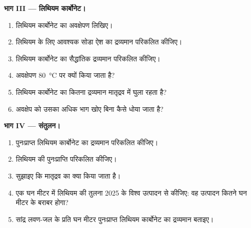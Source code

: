 \begin{problem}
\medskip
\noindent\textbf{भाग III --- लिथियम कार्बोनेट।}
\begin{enumerate}[resume]
  \item लिथियम कार्बोनेट का अवक्षेपण लिखिए।
  \item लिथियम के लिए आवश्यक सोडा ऐश का द्रव्यमान परिकलित कीजिए।
  \item लिथियम कार्बोनेट का सैद्धांतिक द्रव्यमान परिकलित कीजिए।
  \item अवक्षेपण \qty{80}{\celsius} पर क्यों किया जाता है?
  \item लिथियम कार्बोनेट का कितना द्रव्यमान मातृद्रव में घुला रहता है?
  \item अवक्षेप को उसका अधिक भाग खोए बिना कैसे धोया जाता है?
\end{enumerate}

\medskip
\noindent\textbf{भाग IV --- संतुलन।}
\begin{enumerate}[resume]
  \item पुनःप्राप्त लिथियम कार्बोनेट का द्रव्यमान परिकलित कीजिए।
  \item लिथियम की पुनःप्राप्ति परिकलित कीजिए।
  \item सुझाइए कि मातृद्रव का क्या किया जाता है।
  \item एक घन मीटर में लिथियम की तुलना 2025 के विश्व उत्पादन
        से कीजिए: वह उत्पादन कितने घन मीटर के बराबर होगा?
  \item सांद्र लवण-जल के प्रति घन मीटर पुनःप्राप्त लिथियम कार्बोनेट का द्रव्यमान
        बताइए।
\end{enumerate}
\end{problem}
